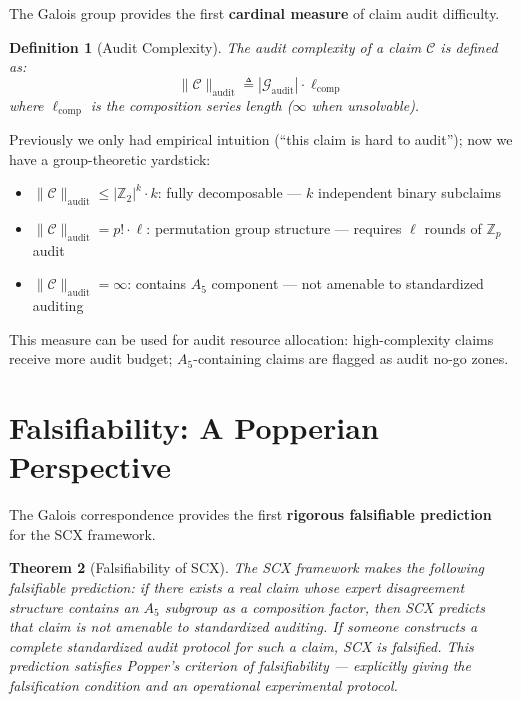 \documentclass[10pt,a4paper]{article}
\newtheorem{theorem}{Theorem}[section]
\newtheorem{definition}[theorem]{Definition}
\theoremstyle{remark}
\begin{document}
The Galois group provides the first \textbf{cardinal measure} of claim audit difficulty.

\begin{definition}[Audit Complexity]
The audit complexity of a claim $\mathcal{C}$ is defined as:
\begin{equation}
\|\mathcal{C}\|_{\text{audit}} \triangleq |\mathcal{G}_{\text{audit}}| \cdot \ell_{\text{comp}}
\end{equation}
where $\ell_{\text{comp}}$ is the composition series length ($\infty$ when unsolvable).
\end{definition}

Previously we only had empirical intuition (``this claim is hard to audit''); now we have a group-theoretic yardstick:
\begin{itemize}
  \item $\|\mathcal{C}\|_{\text{audit}} \le |\mathbb{Z}_2|^k \cdot k$: fully decomposable --- $k$ independent binary subclaims
  \item $\|\mathcal{C}\|_{\text{audit}} = p! \cdot \ell$: permutation group structure --- requires $\ell$ rounds of $\mathbb{Z}_p$ audit
  \item $\|\mathcal{C}\|_{\text{audit}} = \infty$: contains $A_5$ component --- not amenable to standardized auditing
\end{itemize}

This measure can be used for audit resource allocation: high-complexity claims receive more audit budget; $A_5$-containing claims are flagged as audit no-go zones.

\section{Falsifiability: A Popperian Perspective}

The Galois correspondence provides the first \textbf{rigorous falsifiable prediction} for the SCX framework.

\begin{theorem}[Falsifiability of SCX]
The SCX framework makes the following falsifiable prediction: if there exists a real claim whose expert disagreement structure contains an $A_5$ subgroup as a composition factor, then SCX predicts that claim is not amenable to standardized auditing. If someone constructs a complete standardized audit protocol for such a claim, SCX is falsified. This prediction satisfies Popper's criterion of falsifiability --- explicitly giving the falsification condition and an operational experimental protocol.
\end{theorem}
\end{document}
